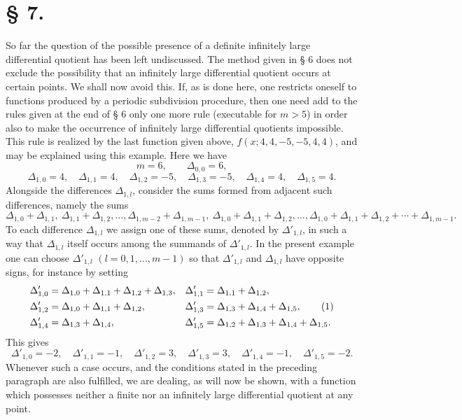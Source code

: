 \section*{§ 7.}

So far the question of the possible presence of a definite infinitely large differential quotient has been left undiscussed. The method given in § 6 does not exclude the possibility that an infinitely large differential quotient occurs at certain points. We shall now avoid this. If, as is done here, one restricts oneself to functions produced by a periodic subdivision procedure, then one need add to the rules given at the end of § 6 only one more rule (executable for $m>5$) in order also to make the occurrence of infinitely large differential quotients impossible. This rule is realized by the last function given above, $f(x;4,4,-5,-5,4,4)$, and may be explained using this example. Here we have
\[
 m=6,
 \qquad
 \Delta_{0,0}=6,
\]
\[
 \Delta_{1,0}=4,\quad \Delta_{1,1}=4,
 \quad \Delta_{1,2}=-5,
 \quad \Delta_{1,3}=-5,
 \quad \Delta_{1,4}=4,
 \quad \Delta_{1,5}=4.
\]
Alongside the differences $\Delta_{1,l}$, consider the sums formed from adjacent such differences, namely the sums
\[
 \Delta_{1,0}+\Delta_{1,1},\ \Delta_{1,1}+\Delta_{1,2},\ldots,
 \Delta_{1,m-2}+\Delta_{1,m-1},\
 \Delta_{1,0}+\Delta_{1,1}+\Delta_{1,2},\ldots,
 \Delta_{1,0}+\Delta_{1,1}+\Delta_{1,2}+\cdots+\Delta_{1,m-1}.
\]
To each difference $\Delta_{1,l}$ we assign one of these sums, denoted by $\Delta'_{1,l}$, in such a way that $\Delta_{1,l}$ itself occurs among the summands of $\Delta'_{1,l}$. In the present example one can choose $\Delta'_{1,l}$ $(l=0,1,\ldots,m-1)$ so that $\Delta'_{1,l}$ and $\Delta_{1,l}$ have opposite signs, for instance by setting
\begin{align}
 \Delta'_{1,0}&=\Delta_{1,0}+\Delta_{1,1}+\Delta_{1,2}+\Delta_{1,3},
 &\Delta'_{1,1}&=\Delta_{1,1}+\Delta_{1,2},\notag\\
 \Delta'_{1,2}&=\Delta_{1,0}+\Delta_{1,1}+\Delta_{1,2},
 &\Delta'_{1,3}&=\Delta_{1,3}+\Delta_{1,4}+\Delta_{1,5},\tag{1}\\
 \Delta'_{1,4}&=\Delta_{1,3}+\Delta_{1,4},
 &\Delta'_{1,5}&=\Delta_{1,2}+\Delta_{1,3}+\Delta_{1,4}+\Delta_{1,5}.
\notag
\end{align}
This gives
\[
 \Delta'_{1,0}=-2,
 \quad \Delta'_{1,1}=-1,
 \quad \Delta'_{1,2}=3,
 \quad \Delta'_{1,3}=3,
 \quad \Delta'_{1,4}=-1,
 \quad \Delta'_{1,5}=-2.
\]
Whenever such a case occurs, and the conditions stated in the preceding paragraph are also fulfilled, we are dealing, as will now be shown, with a function which possesses neither a finite nor an infinitely large differential quotient at any point.


